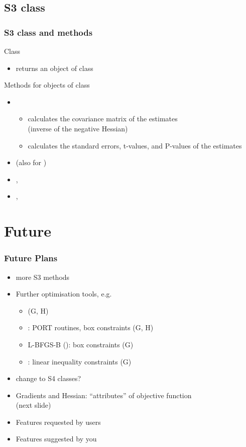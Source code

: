 \documentclass{beamer}
\begin{document}
\subsection{S3 class}
\begin{frame}
\frametitle{S3 class and methods}
Class
\begin{itemize}
\item {} returns an object of class 
\end{itemize}
\vspace*{2ex}
Methods for objects of class 
\begin{itemize}
\item {}
   \begin{itemize}
   \item calculates the covariance matrix of the estimates\\
      (inverse of the negative Hessian)
   \item calculates the standard errors, t-values, and P-values of the estimates
   \end{itemize}
\item {} (also for )
\item {}, 
\item {}, 
\end{itemize}
\end{frame}


\section{Future}
\begin{frame}
\frametitle{Future Plans}
\begin{itemize}
\item more S3 methods
\item Further optimisation tools, e.g.
   \begin{itemize}
   \item {} (G, H)
   \item {}: PORT routines, box constraints (G, H)
   \item L-BFGS-B (): box constraints (G)
   \item {}: linear inequality constraints (G)
   \end{itemize}
\item change to S4 classes?
\item Gradients and Hessian: ``attributes'' of objective function\\
   (next slide)
\item Features requested by users
\item Features suggested by you
\end{itemize}
\end{frame}
\end{document}
